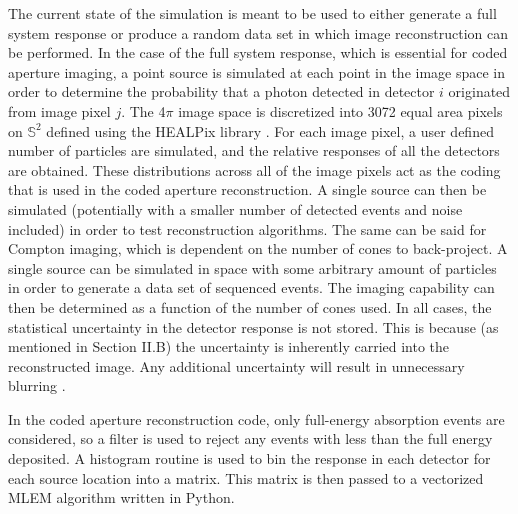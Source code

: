 \documentclass[10pt]{article}
\begin{document}
The current state of the simulation is meant to be used to either generate a full system response or produce a random data set in which image reconstruction can be performed. In the case of the full system response, which is essential for coded aperture imaging, a point source is simulated at each point in the image space in order to determine the probability that a photon detected in detector $i$ originated from image pixel $j$. The 4$\pi$ image space is discretized into 3072 equal area pixels on $\mathbb{S}^2$ defined using the HEALPix library \cite{Healpix2005}. For each image pixel, a user defined number of particles are simulated, and the relative responses of all the detectors are obtained. These distributions across all of the image pixels act as the coding that is used in the coded aperture reconstruction. A single source can then be simulated (potentially with a smaller number of detected events and noise included) in order to test reconstruction algorithms. The same can be said for Compton imaging, which is dependent on the number of cones to back-project. A single source can be simulated in space with some arbitrary amount of particles in order to generate a data set of sequenced events. The imaging capability can then be determined as a function of the number of cones used. In all cases, the statistical uncertainty in the detector response is not stored. This is because (as mentioned in Section II.B) the uncertainty is inherently carried into the reconstructed image. Any additional uncertainty will result in unnecessary blurring \cite{Wahl2011, Haefner2015}.



In the coded aperture reconstruction code, only full-energy absorption events are considered, so a filter is used to reject any events with less than the full energy deposited. A histogram routine is used to bin the response in each detector for each source location into a matrix. This matrix is then passed to a vectorized MLEM algorithm written in Python.
\end{document}
